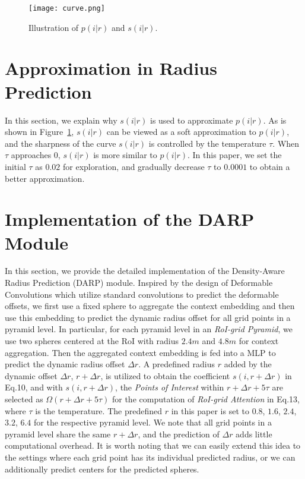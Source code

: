 \documentclass[10pt,twocolumn,letterpaper]{article}
\begin{document}
\clearpage
{\small


}
\clearpage

\appendix

\begin{figure}[!t]
\centering
\texttt{[image: curve.png]}
\caption{Illustration of $p(i|r)$ and $s(i|r)$.}
\label{fig_curve}
\end{figure}

\section{Approximation in Radius Prediction}
In this section, we explain why $s(i|r)$ is used to approximate $p(i|r)$. As is shown in Figure~\ref{fig_curve}, $s(i|r)$ can be viewed as a soft approximation to $p(i|r)$, and the sharpness of the curve $s(i|r)$ is controlled by the temperature $\tau$. When $\tau$ approaches $0$, $s(i|r)$ is more similar to $p(i|r)$. In this paper, we set the initial $\tau$ as $0.02$ for exploration, and gradually decrease $\tau$ to $0.0001$ to obtain a better approximation.

\section{Implementation of the DARP Module}
In this section, we provide the detailed implementation of the Density-Aware Radius Prediction (DARP) module. Inspired by the design of Deformable Convolutions which utilize standard convolutions to predict the deformable offsets, we first use a fixed sphere to aggregate the context embedding and then use this embedding to predict the dynamic radius offset for all grid points in a pyramid level. In particular, for each pyramid level in an \textit{RoI-grid Pyramid}, we use two spheres centered at the RoI with radius $2.4m$ and $4.8m$ for context aggregation. Then the aggregated context embedding is fed into a MLP to predict the dynamic radius offset $\Delta r$. A predefined radius $r$ added by the dynamic offset $\Delta r$, \ie $r + \Delta r$, is utilized to obtain the coefficient $s(i, r+\Delta r)$ in Eq.10, and with $s(i, r+\Delta r)$, the \textit{Points of Interest} within $r + \Delta r + 5\tau$ are selected as $\Omega(r + \Delta r + 5\tau)$ for the computation of \textit{RoI-grid Attention} in Eq.13, where $\tau$ is the temperature. The predefined $r$ in this paper is set to $0.8$, $1.6$, $2.4$, $3.2$, $6.4$ for the respective pyramid level. We note that all grid points in a pyramid level share the same $r + \Delta r$, and the prediction of $\Delta r$ adds little computational overhead. It is worth noting that we can easily extend this idea to the settings where each grid point has its individual predicted radius, or we can additionally predict centers for the predicted spheres. 
\end{document}
